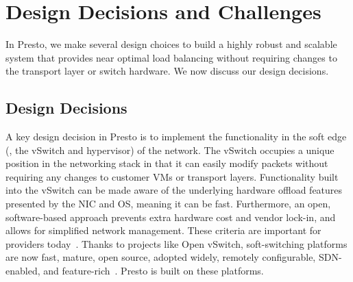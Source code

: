 \section{Design Decisions and Challenges}
\label{sec:background}

In Presto, we make several design choices to 
build a highly robust and scalable system that provides near optimal load 
balancing without requiring changes to the transport layer or switch hardware. We 
now discuss our design decisions.


\subsection{Design Decisions}

 A key design decision in Presto 
is to implement the functionality in the soft edge (\ie, the vSwitch and hypervisor) of 
the network. 
The vSwitch occupies a unique position in the networking stack 
in that it can easily modify packets without requiring any changes to customer VMs or transport layers.
Functionality built into the vSwitch can be made aware of the underlying hardware offload
features presented by the NIC and OS, meaning it can be fast.
Furthermore, an open, software-based approach prevents extra hardware cost and vendor 
lock-in, and allows for simplified network management. 
These criteria are important for providers today~\cite{aws-peek}.
Thanks to projects like Open vSwitch, 
soft-switching platforms are now fast, mature, open source, adopted widely, remotely 
configurable, SDN-enabled, and feature-rich~\cite{ovs-edge,nv-mtd}. Presto is built on these 
platforms.

